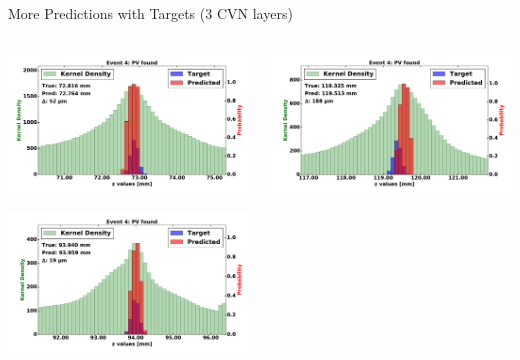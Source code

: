 \begin{frame}{More Predictions with Targets (3 CVN layers)}
  \begin{columns}[c]
        \begin{center}
            \includegraphics[width=1\textwidth,height=0.45\textwidth, trim=18 0 18 0]{images/120000_3layer_24.pdf}

            \includegraphics[width=1\textwidth, height=0.45\textwidth,trim=18 0 18 0]{images/120000_3layer_25.pdf}

        \end{center}
        \begin{center}
           \includegraphics[width=1\textwidth, height=0.45\textwidth, trim=18 0 18 0]{images/120000_3layer_26.pdf}


\end{center}
\end{columns}
\end{frame}
